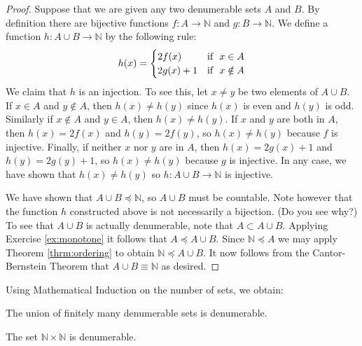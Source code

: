 \begin{proof}
Suppose that we are given any two denumerable sets $A$ and $B$.  By definition there are bijective functions $f:A\to \mathbb N$ and $g:B\to \mathbb N$.  We define a function $h:A\cup B\to \mathbb N$ by the following rule:  \[ h(x)=\begin{cases} 2f(x) & \mbox{if }\ x\in A\cr 2g(x)+1 & \mbox{if }\ x\notin A\cr\end{cases}\]  We claim that $h$ is an injection.  To see this, let $x\neq y$ be two elements of $A\cup B$.  If $x\in A$ and $y\notin A$, then $h(x)\neq h(y)$ since $h(x)$ is even and $h(y)$ is odd.  Similarly if $x\notin A$ and $y\in A$, then $h(x)\neq
h(y)$.  If $x$ and $y$ are both in $A$, then $h(x)=2f(x)$ and $h(y)=2f(y)$, so $h(x)\neq h(y)$ because $f$ is injective.  Finally, if neither $x$ nor $y$ are in $A$, then $h(x)=2g(x)+1$ and $h(y)=2g(y)+1$, so $h(x)\neq h(y)$ because $g$ is injective.  In any case, we have shown that $h(x)\neq h(y)$ so $h:A\cup B\to \mathbb N$ is injective.

We have shown that $A\cup B\preceq\mathbb N$, so $A\cup B$ must be countable.  Note however that the function $h$ constructed above is not necessarily a bijection. (Do you see why?) To see that $A\cup B$ is actually denumerable, note that $A\subset A\cup B$.  Applying Exercise \ref{ex:monotone} it follows that $A\preceq A\cup B$.  Since $\mathbb N\preceq A$ we may apply Theorem \ref{thrm:ordering} to obtain $\mathbb N\preceq A\cup B$.  It now follows from the Cantor-Bernstein Theorem that $A\cup B\equiv \mathbb N$ as desired.
\end{proof}

Using Mathematical Induction on the number of sets, we obtain:

\begin{coro}
The union of finitely many denumerable sets is denumerable.
\end{coro}

\begin{thrm}\label{thrm:Nsquared}
The set $\mathbb N\times \mathbb N$ is denumerable.
\end{thrm}

